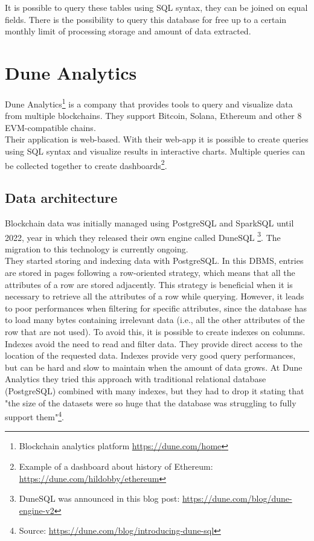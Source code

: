 It is possible to query these tables using SQL syntax, they can be joined on equal fields. There is the possibility to query this database for free up to a certain monthly limit of processing storage and amount of data extracted. 

\section{Dune Analytics}

Dune Analytics\footnote{Blockchain analytics platform \url{https://dune.com/home}} is a company that provides tools to query and visualize data from multiple blockchains. They support Bitcoin, Solana, Ethereum and other 8 EVM-compatible chains.\\

Their application is web-based. With their web-app it is possible to create queries using SQL syntax and visualize results in interactive charts. Multiple queries can be collected together to create dashboards\footnote{Example of a dashboard about history of Ethereum: \url{https://dune.com/hildobby/ethereum}}.  

\subsection{Data architecture}

Blockchain data was initially managed using PostgreSQL and SparkSQL until 2022, year in which they released their own engine called DuneSQL \footnote{DuneSQL was announced in this blog post: \url{https://dune.com/blog/dune-engine-v2}}. The migration to this technology is currently ongoing. \\

They started storing and indexing data with PostgreSQL.
In this DBMS, entries are stored in pages following a row-oriented strategy, which means that all the attributes of a row are stored adjacently. 
This strategy is beneficial when it is necessary to retrieve all the attributes of a row while querying. 
However, it leads to poor performances when filtering for specific attributes, since the database has to load many bytes containing irrelevant data (i.e., all the other attributes of the row that are not used). 
To avoid this, it is possible to create indexes on columns. 
Indexes avoid the need to read and filter data. They provide direct access to the location of the requested data.
Indexes provide very good query performances, but can be hard and slow to maintain when the amount of data grows.
At Dune Analytics they tried this approach with traditional relational database (PostgreSQL) combined with many indexes, but they had to drop it stating that "the size of the datasets were so huge that the database was struggling to fully support them"\footnote{Source: \url{https://dune.com/blog/introducing-dune-sql}}. \\

